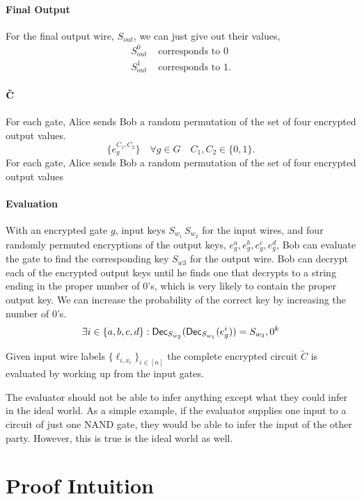 \paragraph{Final Output}
For the final output wire, $S_{out}$, we can just give out their values,
\begin{align*}
S_{out}^0 &\text{ corresponds to 0}\\
S_{out}^1 &\text{ corresponds to 1.}
\end{align*}

\paragraph{$\bold{\tilde{C}}$}
For each gate, Alice sends Bob a random permutation of the set of four encrypted output values.
\[
\{e_g^{C_1, C_2} \} \quad \forall g \in G \quad C_1, C_2 \in \{0,1\}.
\]
For each gate, Alice sends Bob a random permutation of the set of four encrypted output values

\paragraph{Evaluation}
With an encrypted gate $g$,
input keys $S_{w_1} \, S_{w_2}$ for the input wires,
and four randomly permuted encryptions of the output keys, $e_g^{a}, e_g^{b}, e_g^{c}, e_g^{d}$,
Bob can evaluate the gate to find the corresponding key $S_{w3}$ for the output wire.
Bob can decrypt each of the encrypted output keys until he finds one that decrypts 
to a string ending in the proper number of $0$'s, which is very likely to contain the proper output key.
We can increase the probability of the correct key by increasing the number of $0$'s. 
\[
\exists  i \in \{a, b, c, d\} : \mathsf{Dec}_{S_{w_2}} ( \mathsf{Dec}_{S_{w_1}} ( e_g^{i} ))  = S_{w_3}, 0^k
\]

Given input wire labels 
$\{ \ell_{i, x_i} \}_{i \in [n]}$
the complete encrypted circuit $\tilde{C}$ is evaluated by working up from the input gates. 




The evaluator should not be able to infer anything except what they could infer in the ideal world.
As a simple example, if the evaluator supplies one input to a circuit of just one NAND gate,
 they would be able to infer the input of the other party. However, this is true is the ideal world as well.

\section{Proof Intuition}

